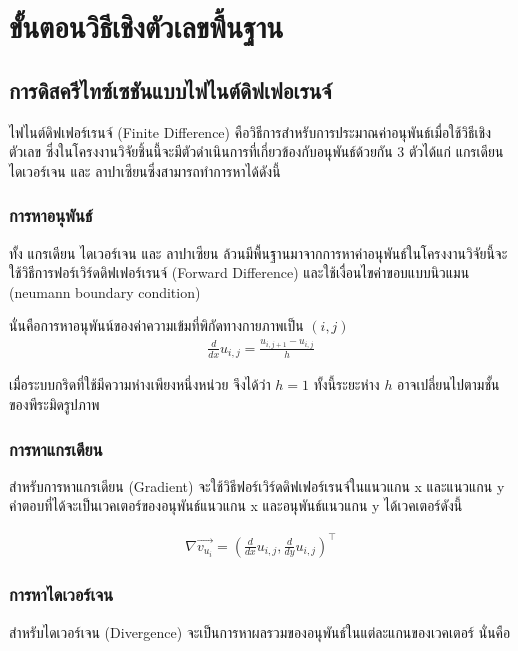 \section{ขั้นตอนวิธีเชิงตัวเลขพื้นฐาน}
\subsection{การดิสครีไทซ์เซชันแบบไฟไนต์ดิฟเฟอเรนจ์}

\hspace{1cm}ไฟไนต์ดิฟเฟอร์เรนจ์ (Finite Difference) คือวิธีการสำหรับการประมาณค่าอนุพันธ์เมื่อใช้วิธีเชิงตัวเลข ซึ่งในโครงงานวิจัยชิ้นนี้จะมีตัวดำเนินการที่เกี่ยวข้องกับอนุพันธ์ด้วยกัน 3 ตัวได้แก่ แกรเดียน ไดเวอร์เจน และ ลาปาเซียนซึ่งสามารถทำการหาได้ดังนี้

\subsubsection{การหาอนุพันธ์}

\hspace{1cm}ทั้ง แกรเดียน ไดเวอร์เจน และ ลาปาเซียน ล้วนมีพื้นฐานมาจากการหาค่าอนุพันธ์ในโครงงานวิจัยนี้จะใช้วิธีการฟอร์เวิร์ดดิฟเฟอร์เรนจ์ (Forward Difference) และใช้เงื่อนไขค่าขอบแบบนิวแมน (neumann boundary condition)

\noindent\hspace{1cm}นั่นคือการหาอนุพันน์ของค่าความเข้มที่พิกัดทางกายภาพเป็น $(i,j)$
\begin{align*}
	\frac{d}{dx} u_{i,j} = \frac{u_{i,j+1} - u_{i,j}}{h}
\end{align*}

เมื่อระบบกริดที่ใช้มีความห่างเพียงหนึ่งหน่วย จึงได้ว่า $h=1$ ทั้งนี้ระยะห่าง $h$ อาจเปลี่ยนไปตามชั้นของพีระมิดรูปภาพ

\subsubsection{การหาแกรเดียน}
\noindent\hspace{1cm}สำหรับการหาแกรเดียน (Gradient) จะใช้วิธีฟอร์เวิร์ดดิฟเฟอร์เรนจ์ในแนวแกน x และแนวแกน y คำตอบที่ได้จะเป็นเวคเตอร์ของอนุพันธ์แนวแกน x และอนุพันธ์แนวแกน y ได้เวคเตอร์ดังนี้ 

\begin{align*}
	\nabla \vec{v_{u_i}} = (\frac{d}{dx} u_{i,j},\frac{d}{dy} u_{i,j})^{\top}	
\end{align*}

\subsubsection{การหาไดเวอร์เจน}
\noindent\hspace{1cm}สำหรับไดเวอร์เจน (Divergence) จะเป็นการหาผลรวมของอนุพันธ์ในแต่ละแกนของเวคเตอร์ นั่นคือ 

